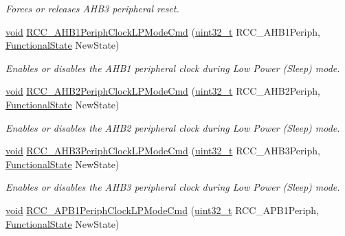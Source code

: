 \begin{DoxyCompactItemize}
\begin{DoxyCompactList}\small\item\em Forces or releases A\-H\-B3 peripheral reset. \end{DoxyCompactList}\item 
\hyperlink{group___n_a_m_e_ga18028b8badbf1ea7e704ccac3c488e82}{void} \hyperlink{group___r_c_c___group3_ga5cd0d5adbc7496d7005b208bd19ce255}{R\-C\-C\-\_\-\-A\-H\-B1\-Periph\-Clock\-L\-P\-Mode\-Cmd} (\hyperlink{stdint_8h_a435d1572bf3f880d55459d9805097f62}{uint32\-\_\-t} R\-C\-C\-\_\-\-A\-H\-B1\-Periph, \hyperlink{group___exported__types_gac9a7e9a35d2513ec15c3b537aaa4fba1}{Functional\-State} New\-State)
\begin{DoxyCompactList}\small\item\em Enables or disables the A\-H\-B1 peripheral clock during Low Power (Sleep) mode. \end{DoxyCompactList}\item 
\hyperlink{group___n_a_m_e_ga18028b8badbf1ea7e704ccac3c488e82}{void} \hyperlink{group___r_c_c___group3_ga1ac5bb9676ae9b48e50d6a95de922ce3}{R\-C\-C\-\_\-\-A\-H\-B2\-Periph\-Clock\-L\-P\-Mode\-Cmd} (\hyperlink{stdint_8h_a435d1572bf3f880d55459d9805097f62}{uint32\-\_\-t} R\-C\-C\-\_\-\-A\-H\-B2\-Periph, \hyperlink{group___exported__types_gac9a7e9a35d2513ec15c3b537aaa4fba1}{Functional\-State} New\-State)
\begin{DoxyCompactList}\small\item\em Enables or disables the A\-H\-B2 peripheral clock during Low Power (Sleep) mode. \end{DoxyCompactList}\item 
\hyperlink{group___n_a_m_e_ga18028b8badbf1ea7e704ccac3c488e82}{void} \hyperlink{group___r_c_c___group3_ga4e1df07cdfd81c068902d9d35fcc3911}{R\-C\-C\-\_\-\-A\-H\-B3\-Periph\-Clock\-L\-P\-Mode\-Cmd} (\hyperlink{stdint_8h_a435d1572bf3f880d55459d9805097f62}{uint32\-\_\-t} R\-C\-C\-\_\-\-A\-H\-B3\-Periph, \hyperlink{group___exported__types_gac9a7e9a35d2513ec15c3b537aaa4fba1}{Functional\-State} New\-State)
\begin{DoxyCompactList}\small\item\em Enables or disables the A\-H\-B3 peripheral clock during Low Power (Sleep) mode. \end{DoxyCompactList}\item 
\hyperlink{group___n_a_m_e_ga18028b8badbf1ea7e704ccac3c488e82}{void} \hyperlink{group___r_c_c___group3_ga84dd64badb84768cbcf19e241cadff50}{R\-C\-C\-\_\-\-A\-P\-B1\-Periph\-Clock\-L\-P\-Mode\-Cmd} (\hyperlink{stdint_8h_a435d1572bf3f880d55459d9805097f62}{uint32\-\_\-t} R\-C\-C\-\_\-\-A\-P\-B1\-Periph, \hyperlink{group___exported__types_gac9a7e9a35d2513ec15c3b537aaa4fba1}{Functional\-State} New\-State)

\end{DoxyCompactItemize}
